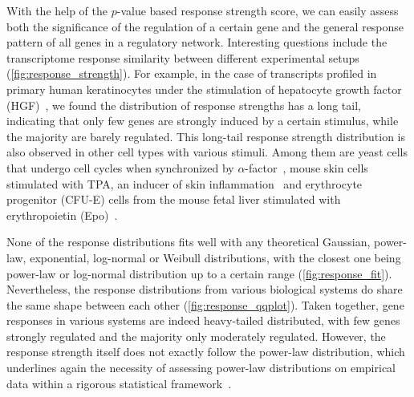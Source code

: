 With the help of the $p$-value based response strength score,
we can easily assess both the significance of the regulation of
a certain gene and the general response pattern of all genes
in a regulatory network.
Interesting questions include the transcriptome response
similarity between different
experimental setups (\ref{fig:response_strength}). 
For example, in the case of transcripts
profiled in primary human keratinocytes under the stimulation of 
hepatocyte growth factor (HGF)~\citep{Busch2008}, we found the distribution of response
strengths has a long tail, indicating that 
only few genes are strongly induced by a certain stimulus, while the majority 
are barely regulated. This long-tail response strength
distribution is also observed in other cell types with various stimuli.
Among them are yeast cells that undergo cell cycles when synchronized by 
$\alpha$-factor~\citep{Spellman1998,Cho1998}, mouse skin cells stimulated with TPA,
an inducer of skin inflammation~\citep{Riehl2010} and erythrocyte progenitor
(CFU-E) cells from the mouse fetal liver stimulated with erythropoietin (Epo)~\citep{Bachmann2011}. 

None of the response distributions fits well with any theoretical 
Gaussian, power-law, exponential, log-normal or Weibull distributions, with the closest one being power-law or log-normal
distribution up to a certain range (\ref{fig:response_fit}). 
Nevertheless, the response distributions from various 
biological systems do share the same shape between each 
other (\ref{fig:response_qqplot}). Taken together, gene
responses in various systems are indeed heavy-tailed distributed, with few
genes strongly regulated and the majority only moderately
regulated. However, the response strength itself does not exactly 
follow the power-law distribution,
which underlines again the necessity of assessing power-law
distributions on empirical data within a rigorous statistical
framework~\citep{Clauset2009}.

